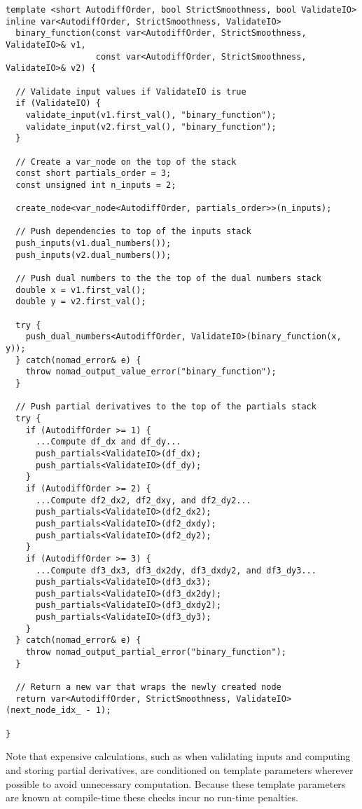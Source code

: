 \begin{verbatim}
template <short AutodiffOrder, bool StrictSmoothness, bool ValidateIO>
inline var<AutodiffOrder, StrictSmoothness, ValidateIO>
  binary_function(const var<AutodiffOrder, StrictSmoothness, ValidateIO>& v1,
                  const var<AutodiffOrder, StrictSmoothness, ValidateIO>& v2) {
    
  // Validate input values if ValidateIO is true
  if (ValidateIO) {
    validate_input(v1.first_val(), "binary_function");
    validate_input(v2.first_val(), "binary_function");
  }
      
  // Create a var_node on the top of the stack
  const short partials_order = 3;
  const unsigned int n_inputs = 2;
    
  create_node<var_node<AutodiffOrder, partials_order>>(n_inputs);

  // Push dependencies to top of the inputs stack
  push_inputs(v1.dual_numbers());
  push_inputs(v2.dual_numbers());

  // Push dual numbers to the the top of the dual numbers stack
  double x = v1.first_val();
  double y = v2.first_val();
    
  try {
    push_dual_numbers<AutodiffOrder, ValidateIO>(binary_function(x, y));
  } catch(nomad_error& e) {
    throw nomad_output_value_error("binary_function");
  }
    
  // Push partial derivatives to the top of the partials stack
  try {
    if (AutodiffOrder >= 1) {
      ...Compute df_dx and df_dy...
      push_partials<ValidateIO>(df_dx);
      push_partials<ValidateIO>(df_dy);
    }
    if (AutodiffOrder >= 2) {
      ...Compute df2_dx2, df2_dxy, and df2_dy2...
      push_partials<ValidateIO>(df2_dx2);
      push_partials<ValidateIO>(df2_dxdy);
      push_partials<ValidateIO>(df2_dy2);
    }
    if (AutodiffOrder >= 3) {
      ...Compute df3_dx3, df3_dx2dy, df3_dxdy2, and df3_dy3...
      push_partials<ValidateIO>(df3_dx3);
      push_partials<ValidateIO>(df3_dx2dy);
      push_partials<ValidateIO>(df3_dxdy2);
      push_partials<ValidateIO>(df3_dy3);
    }
  } catch(nomad_error& e) {
    throw nomad_output_partial_error("binary_function");
  }

  // Return a new var that wraps the newly created node
  return var<AutodiffOrder, StrictSmoothness, ValidateIO>(next_node_idx_ - 1);
    
}
\end{verbatim}
%
Note that expensive calculations, such as when validating inputs and computing
and storing partial derivatives, are conditioned on template parameters wherever 
possible to avoid unnecessary computation.  Because these template parameters 
are known at compile-time these checks incur no run-time penalties.

